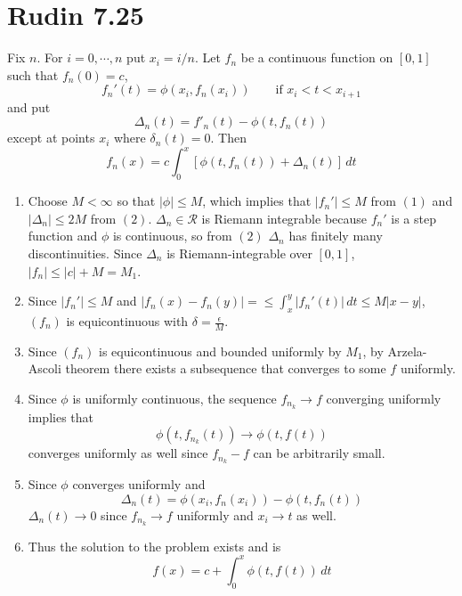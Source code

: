\documentclass{article}
\begin{document}
\section*{Rudin 7.25}
Fix $n$. For $i = 0, \cdots, n$ put $x_i = i/n$. 
Let $f_n$ be a continuous function on $[0,1]$ such that $f_n(0) = c$,
\begin{equation}
  f_n'(t) = \phi(x_i, f_n(x_i)) \qquad \text{if } x_i < t < x_{i+1}
\end{equation}
and put 
\begin{equation}
  \Delta_n(t) = f'_n(t) - \phi(t,f_n(t))
\end{equation}
except at points $x_i$ where $\delta_n(t) = 0$. Then 
\begin{equation}
  f_n(x) = c \int_0^x [\phi(t,f_n(t)) + \Delta_n(t)] \,dt
\end{equation}
\begin{enumerate}[label=(\alph*)]
  \item Choose $M < \infty$ so that $|\phi| \leq M$, 
        which implies that $|f_n'| \leq M$ from $(1)$
        and $|\Delta_n| \leq 2M$ from $(2)$.
        $\Delta_n \in \mathscr{R}$ is Riemann integrable because
        $f_n'$ is a step function and $\phi$ is continuous, so from $(2)$
        $\Delta_n$ has finitely many discontinuities.
        Since $\Delta_n$ is Riemann-integrable over $[0,1]$, 
        $|f_n| \leq |c| + M = M_1$.
  \item Since $|f_n'| \leq M$ and $|f_n(x) - f_n(y)| =\leq\int_x^y |f_n'(t)| \,dt \leq M|x-y|$,
        $(f_n)$ is equicontinuous with $\delta = \frac{\epsilon}{M}$.
  \item Since $(f_n)$ is equicontinuous and bounded uniformly by $M_1$,
        by Arzela-Ascoli theorem there exists a subsequence that converges to some $f$ uniformly.
  \item Since $\phi$ is uniformly continuous, the sequence $f_{n_k} \to f$ converging uniformly
        implies that 
        \[
          \phi(t, f_{n_k}(t)) \to \phi(t,f(t))
        \]
        converges uniformly as well since $f_{n_k} - f$ can be arbitrarily small.
  \item Since $\phi$ converges uniformly and 
  \[
    \Delta_n(t) = \phi(x_i, f_n(x_i)) - \phi(t, f_n(t))
  \]
  $\Delta_n(t) \to 0$ since $f_{n_k} \to f$ uniformly and $x_i \to t$ as well.
  \item Thus the solution to the problem exists and is
  \[  
      f(x) = c + \int_0^x \phi(t, f(t)) \,dt
  \]
\end{enumerate}
\newpage 
\end{document}

